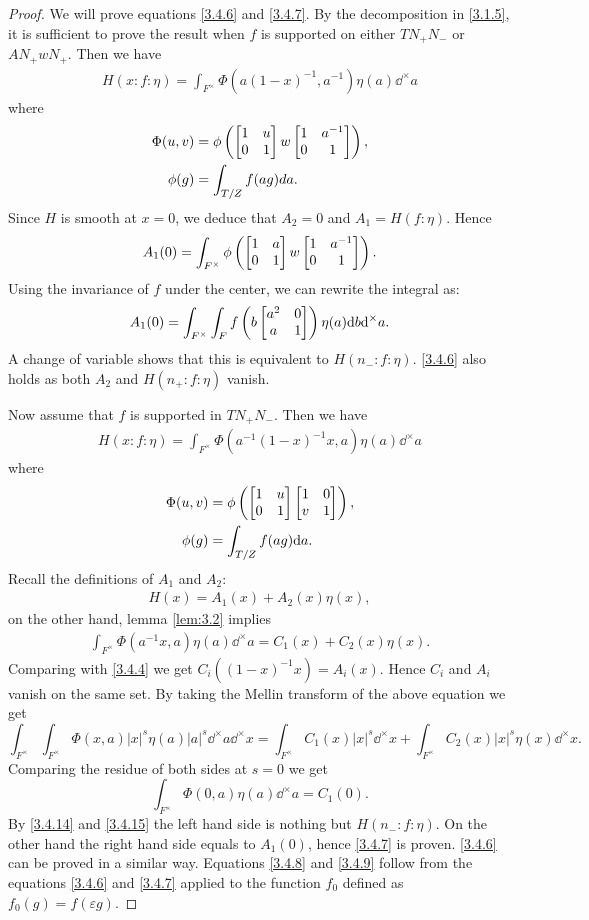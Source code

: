 \begin{proof}
We will prove equations \eqref{3.4.6} and \eqref{3.4.7}. By the decomposition in \eqref{3.1.5}, it is sufficient to prove the result when $f$ is supported on either $TN_+ N_-$ or $AN_{+}wN_{+}$.
Then we have
\begin{align}
    H(x:f:\eta) = \int_{F^\times} \Phi(a(1-x)^{-1}, a^{-1}) \eta(a) \dd^\times a
\end{align}
where
\begin{align}
    \Phi(u, v) &= \phi\left(\begin{bmatrix} 1 & u \\ 0 & 1 \end{bmatrix} w \begin{bmatrix} 1 & a^{-1} \\ 0 & 1 \end{bmatrix}\right), \\
    \phi(g) &= \int_{T/Z} f(ag) da.
\end{align}
Since $H$ is smooth at $x = 0$, we deduce that $A_2 = 0$ and $A_1 = H(f: \eta)$.
Hence
\[
A_1(0) = \int_{F^\times} \phi\left(\begin{bmatrix} 1 & a \\ 0 & 1 \end{bmatrix} w \begin{bmatrix} 1 & a^{-1} \\ 0 & 1 \end{bmatrix}\right).
\]
Using the invariance of $f$ under the center, we can rewrite the integral as:
\[
A_1(0) = \int_{F^\times} \int_{F} f\left(b \begin{bmatrix} a^2 & 0 \\ a & 1 \end{bmatrix}\right) \eta(a) \mathrm{d} b \mathrm{d}^\times a.
\]
A change of variable shows that this is equivalent to $H(n_-: f: \eta)$.
\eqref{3.4.6} also holds as both $A_2$ and $H(n_+:f:\eta)$ vanish.

Now assume that $f$ is supported in $TN_+ N_-$.
Then we have
\begin{align}
    H(x:f:\eta) = \int_{F^\times} \Phi(a^{-1}(1-x)^{-1}x, a) \eta(a) \dd^\times a
\end{align}
where
\begin{align}
    \Phi(u, v) &= \phi\left(\begin{bmatrix} 1 & u \\ 0 & 1 \end{bmatrix} \begin{bmatrix} 1 & 0 \\ v & 1 \end{bmatrix} \right), \label{3.4.14} \\
    \phi(g) &= \int_{T/Z} f(ag) \mathrm{d} a. \label{3.4.15}
\end{align}
Recall the definitions of $A_1$ and $A_2$:
\begin{align}
    H(x) = A_1(x) + A_2(x)\eta(x),
\end{align}
on the other hand, lemma \eqref{lem:3.2} implies
\begin{align}
    \int_{F^\times} \Phi(a^{-1} x, a) \eta(a) \dd^\times a = C_1(x) + C_2(x) \eta(x).
\end{align}
Comparing with \eqref{3.4.4} we get $C_i((1-x)^{-1}x) = A_i(x)$.
Hence $C_i$ and $A_i$ vanish on the same set.
By taking the Mellin transform of the above equation we get
\[
\int_{F^\times} \int_{F^\times} \Phi(x, a) |x|^{s} \eta(a) |a|^{s} \dd^\times a \dd^\times x = \int_{F^\times} C_1(x) |x|^{s} \dd^\times x + \int_{F^\times} C_2(x) |x|^{s} \eta(x) \dd^\times x.
\]
Comparing the residue of both sides at $s = 0$ we get
\[
\int_{F^\times} \Phi(0, a) \eta(a) \dd^\times a = C_1(0).
\]
By \eqref{3.4.14} and \eqref{3.4.15} the left hand side is nothing but $H(n_-:f:\eta)$.
On the other hand the right hand side equals to $A_1(0)$, hence \eqref{3.4.7} is proven.
\eqref{3.4.6} can be proved in a similar way.
Equations \eqref{3.4.8} and \eqref{3.4.9} follow from the equations \eqref{3.4.6} and \eqref{3.4.7} applied to the function $f_0$ defined as $f_0(g) = f(\varepsilon g)$.
\end{proof}